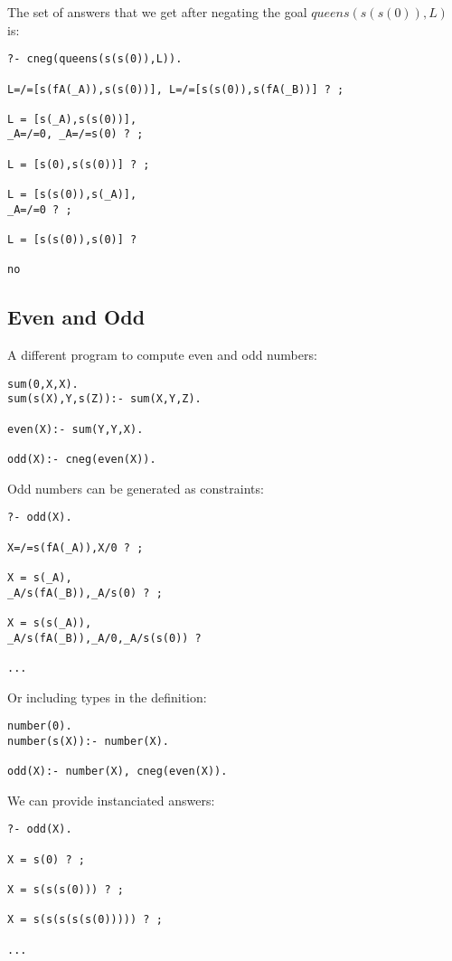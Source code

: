 \documentclass{tlp}
\begin{document}
The set of answers that we get after negating the goal $queens(s(s(0)),L)$ is:
\begin{small}
\begin{verbatim}
?- cneg(queens(s(s(0)),L)).

L=/=[s(fA(_A)),s(s(0))], L=/=[s(s(0)),s(fA(_B))] ? ;

L = [s(_A),s(s(0))],
_A=/=0, _A=/=s(0) ? ;

L = [s(0),s(s(0))] ? ;

L = [s(s(0)),s(_A)],
_A=/=0 ? ;

L = [s(s(0)),s(0)] ? 

no
\end{verbatim}
\end{small}
\subsection*{Even and Odd}

A different program to compute even and odd numbers:
\begin{small}
\begin{verbatim}
sum(0,X,X).
sum(s(X),Y,s(Z)):- sum(X,Y,Z).

even(X):- sum(Y,Y,X).

odd(X):- cneg(even(X)).
\end{verbatim}
\end{small}

Odd numbers can be generated as constraints:
\begin{small}
\begin{verbatim}
?- odd(X).

X=/=s(fA(_A)),X/0 ? ;

X = s(_A),
_A/s(fA(_B)),_A/s(0) ? ;

X = s(s(_A)),
_A/s(fA(_B)),_A/0,_A/s(s(0)) ? 

...
\end{verbatim}
\end{small}

Or including types in the definition:
\begin{small}
\begin{verbatim}
number(0).
number(s(X)):- number(X).

odd(X):- number(X), cneg(even(X)).
\end{verbatim}
\end{small}

We can provide instanciated answers:
\begin{small}
\begin{verbatim}
?- odd(X).

X = s(0) ? ;

X = s(s(s(0))) ? ;

X = s(s(s(s(s(0))))) ? ;

...
\end{verbatim}
\end{small}
\end{document}
